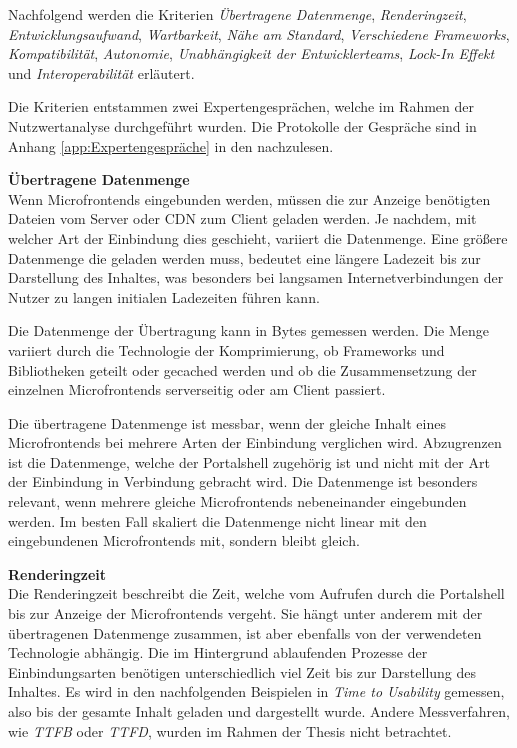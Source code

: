 Nachfolgend werden die Kriterien \textit{Übertragene Datenmenge}, \textit{Renderingzeit}, \textit{Entwicklungsaufwand}, \textit{Wartbarkeit}, \textit{Nähe am Standard}, \textit{Verschiedene Frameworks}, \textit{Kompatibilität}, \textit{Autonomie}, \textit{Unabhängigkeit der Entwicklerteams}, \textit{Lock-In Effekt} und \textit{Interoperabilität} erläutert. 

Die Kriterien entstammen zwei Expertengesprächen, welche im Rahmen der Nutzwertanalyse durchgeführt wurden. Die Protokolle der Gespräche sind in Anhang \ref{app:Expertengespräche} in den  nachzulesen.

\textbf{Übertragene Datenmenge}\\
Wenn Microfrontends eingebunden werden, müssen die zur Anzeige benötigten Dateien vom Server oder \gls{CDN} zum Client geladen werden. Je nachdem, mit welcher Art der Einbindung dies geschieht, variiert die Datenmenge. Eine größere Datenmenge die geladen werden muss, bedeutet eine längere Ladezeit bis zur Darstellung des Inhaltes, was besonders bei langsamen Internetverbindungen der Nutzer zu langen initialen Ladezeiten führen kann.

Die Datenmenge der Übertragung kann in Bytes gemessen werden. Die Menge variiert durch die Technologie der Komprimierung, ob Frameworks und Bibliotheken geteilt oder gecached werden und ob die Zusammensetzung der einzelnen Microfrontends serverseitig oder am Client passiert.

Die übertragene Datenmenge ist messbar, wenn der gleiche Inhalt eines Microfrontends bei mehrere Arten der Einbindung verglichen wird. Abzugrenzen ist die Datenmenge, welche der Portalshell zugehörig ist und nicht mit der Art der Einbindung in Verbindung gebracht wird. Die Datenmenge ist besonders relevant, wenn mehrere gleiche Microfrontends nebeneinander eingebunden werden. Im besten Fall skaliert die Datenmenge nicht linear mit den eingebundenen Microfrontends mit, sondern bleibt gleich.

\textbf{Renderingzeit}\\
Die Renderingzeit beschreibt die Zeit, welche vom Aufrufen durch die Portalshell bis zur Anzeige der Microfrontends vergeht. Sie hängt unter anderem mit der übertragenen Datenmenge zusammen, ist aber ebenfalls von der verwendeten Technologie abhängig. Die im Hintergrund ablaufenden Prozesse der Einbindungsarten benötigen unterschiedlich viel Zeit bis zur Darstellung des Inhaltes. Es wird in den nachfolgenden Beispielen in \textit{Time to Usability} gemessen, also bis der gesamte Inhalt geladen und dargestellt wurde. Andere Messverfahren, wie \textit{\gls{TTFB}} oder \textit{\gls{TTFD}}, wurden im Rahmen der Thesis nicht betrachtet.

